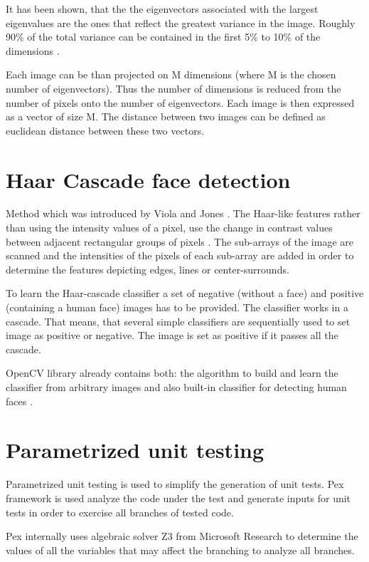 It has been shown, that the the eigenvectors associated with the largest eigenvalues are the ones that reflect the greatest variance in the image. Roughly 90\% of the total variance can be contained in the first 5\% to 10\% of the dimensions \cite{Kyungnam01}.

Each image can be than projected on M dimensions (where M is the chosen number of eigenvectors). Thus the number of dimensions is reduced from the number of pixels onto the number of eigenvectors. Each image is then expressed as a vector of size M. The distance between two images can be defined as euclidean distance between these two vectors.

\section{Haar Cascade face detection}
\label{tech:haarcascade}
Method which was introduced by Viola and Jones \cite{Viola01}. The Haar-like features rather than using the intensity values of a pixel, use the change in contrast values between adjacent rectangular groups of pixels \cite{Wilson06}. The sub-arrays of the image are scanned and the intensities of the pixels of each sub-array are added in order to determine the features depicting edges, lines or center-surrounds.

To learn the Haar-cascade classifier a set of negative (without a face) and positive (containing a human face) images has to be provided. The classifier works in a cascade. That means, that several simple classifiers are sequentially used to set image as positive or negative. The image is set as positive if it passes all the cascade.

OpenCV library already contains both: the algorithm to build and learn the classifier from arbitrary images and also built-in classifier for detecting human faces \cite{opencv:facedetection}.

\section{Parametrized unit testing}
\label{tech:parametrized_testing}

Parametrized unit testing is used to simplify the generation of unit tests. Pex framework is used analyze the code under the test and generate inputs for unit tests in order to exercise all branches of tested code.

Pex internally uses algebraic solver Z3 from Microsoft Research to determine the values of all the variables that may affect the branching to analyze all branches.

